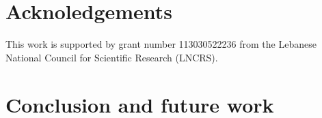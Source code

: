 \documentclass{llncs}
\begin{document}
%
%
\section{Acknoledgements}
\label{sec:acc}
This work is supported by grant number 113030522236 from the Lebanese National Council for Scientific Research (LNCRS).

\section{Conclusion and future work}
\label{sec:future}
\end{document}
